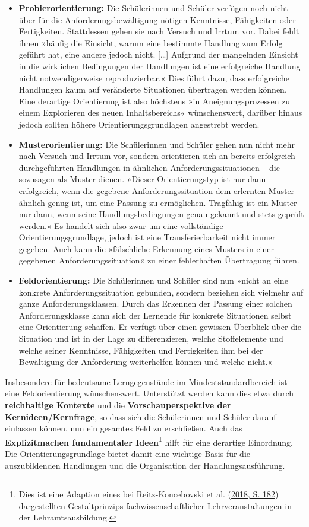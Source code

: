 \documentclass[
]{scrbook}
\theoremstyle{definition}
\theoremstyle{definition}
\theoremstyle{definition}
\theoremstyle{definition}
\theoremstyle{remark}
\begin{document}
\begin{itemize}
\item
  \textbf{Probierorientierung:} Die Schülerinnen und Schüler verfügen noch nicht über für die Anforderungsbewältigung nötigen Kenntnisse, Fähigkeiten oder Fertigkeiten. Stattdessen gehen sie nach Versuch und Irrtum vor. Dabei fehlt ihnen »häufig die Einsicht, warum eine bestimmte Handlung zum Erfolg geführt hat, eine andere jedoch nicht. {[}\ldots{]} Aufgrund der mangelnden Einsicht in die wirklichen Bedingungen der Handlungen ist eine erfolgreiche Handlung nicht notwendigerweise reproduzierbar.« Dies führt dazu, dass erfolgreiche Handlungen kaum auf veränderte Situationen übertragen werden können. Eine derartige Orientierung ist also höchstens »in Aneignungsprozessen zu einem Explorieren des neuen Inhaltsbereichs« wünschenswert, darüber hinaus jedoch sollten höhere Orientierungsgrundlagen angestrebt werden.
\item
  \textbf{Musterorientierung:} Die Schülerinnen und Schüler gehen nun nicht mehr nach Versuch und Irrtum vor, sondern orientieren sich an bereits erfolgreich durchgeführten Handlungen in ähnlichen Anforderungssituationen -- die sozusagen als Muster dienen.
  »Dieser Orientierungstyp ist nur dann erfolgreich, wenn die gegebene Anforderungssituation dem erlernten Muster ähnlich genug ist, um eine Passung zu ermöglichen. Tragfähig ist ein Muster nur dann, wenn seine Handlungsbedingungen genau gekannt und stets geprüft werden.«
  Es handelt sich also zwar um eine vollständige Orientierungsgrundlage, jedoch ist eine Transferierbarkeit nicht immer gegeben. Auch kann die »fälschliche Erkennung eines Musters in einer gegebenen Anforderungssituation« zu einer fehlerhaften Übertragung führen.
\item
  \textbf{Feldorientierung:} Die Schülerinnen und Schüler sind nun »nicht an eine konkrete Anforderungssituation gebunden, sondern beziehen sich vielmehr auf ganze Anforderungsklassen. Durch das Erkennen der Passung einer solchen Anforderungsklasse kann sich der Lernende für konkrete Situationen selbst eine Orientierung schaffen. Er verfügt über einen gewissen Überblick über die Situation und ist in der Lage zu differenzieren, welche Stoffelemente und welche seiner Kenntnisse, Fähigkeiten und Fertigkeiten ihm bei der Bewältigung der Anforderung weiterhelfen können und welche nicht.«
\end{itemize}

Insbesondere für bedeutsame Lerngegenstände im Mindeststandardbereich ist eine Feldorientierung wünschenswert. Unterstützt werden kann dies etwa durch \textbf{reichhaltige Kontexte} und die \textbf{Vorschauperspektive der Kernideen/Kernfrage}, so dass sich die Schülerinnen und Schüler darauf einlassen können, nun ein gesamtes Feld zu erschließen. Auch das \textbf{Explizitmachen fundamentaler Ideen}\footnote{Dies ist eine Adaption eines bei Reitz-Koncebovski et al. (\protect\hyperlink{ref-Reitz-Koncebovski2018}{2018, S. 182}) dargestellten Gestaltprinzips fachwissenschaftlicher Lehrveranstaltungen in der Lehramtsausbildung.} hilft für eine derartige Einordnung. Die Orientierungsgrundlage bietet damit eine wichtige Basis für die auszubildenden Handlungen und die Organisation der Handlungsausführung.
\end{document}
